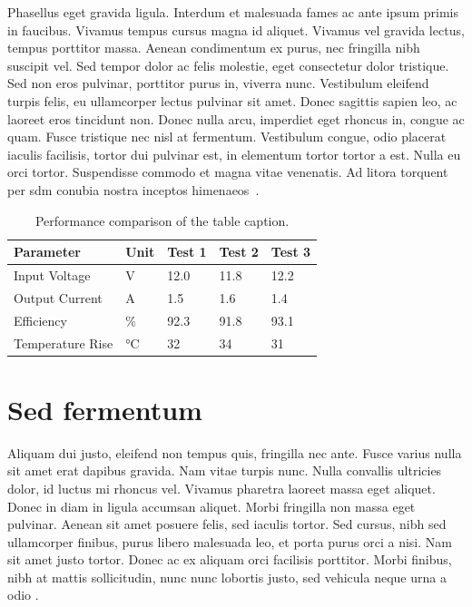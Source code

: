 Phasellus eget gravida ligula. Interdum et malesuada fames ac ante ipsum primis in faucibus. Vivamus tempus cursus magna id aliquet. Vivamus vel gravida lectus, tempus porttitor massa. Aenean condimentum ex purus, nec fringilla nibh suscipit vel. Sed tempor dolor ac felis molestie, eget consectetur dolor tristique. Sed non eros pulvinar, porttitor purus in, viverra nunc. Vestibulum eleifend turpis felis, eu ullamcorper lectus pulvinar sit amet. Donec sagittis sapien leo, ac laoreet eros tincidunt non. Donec nulla arcu, imperdiet eget rhoncus in, congue ac quam. Fusce tristique nec nisl at fermentum. Vestibulum congue, odio placerat iaculis facilisis, tortor dui pulvinar est, in elementum tortor tortor a est. Nulla eu orci tortor. Suspendisse commodo et magna vitae venenatis. Ad litora torquent per \gls{sdm} conubia nostra inceptos himenaeos~.

    \begin{table}[ht]
    \centering
        \begin{tabular}{|l|l|l|l|l|}
            \hline
            \textbf{Parameter} & \textbf{Unit} & \textbf{Test 1} & \textbf{Test 2} & \textbf{Test 3} \\ \hline
            Input Voltage      & V             & 12.0            & 11.8            & 12.2            \\ \hline
            Output Current     & A             & 1.5             & 1.6             & 1.4             \\ \hline
            Efficiency         & \%            & 92.3            & 91.8            & 93.1            \\ \hline
            Temperature Rise   & °C            & 32              & 34              & 31              \\ \hline
        \end{tabular}
        \caption{Performance comparison of the table caption.}
        \label{tab:placeholder_table}
    \end{table}

\section{Sed fermentum}

Aliquam dui justo, eleifend non tempus quis, fringilla nec ante. Fusce varius nulla sit amet erat dapibus gravida. Nam vitae turpis nunc. Nulla convallis ultricies dolor, id luctus mi rhoncus vel. Vivamus pharetra laoreet massa eget aliquet. Donec in diam in ligula accumsan aliquet. Morbi fringilla non massa eget pulvinar. Aenean sit amet posuere felis, sed iaculis tortor. Sed cursus, nibh sed ullamcorper finibus, purus libero malesuada leo, et porta purus orci a nisi. Nam sit amet justo tortor. Donec ac ex aliquam orci facilisis porttitor. Morbi finibus, nibh at mattis sollicitudin, nunc nunc lobortis justo, sed vehicula neque urna a odio .

